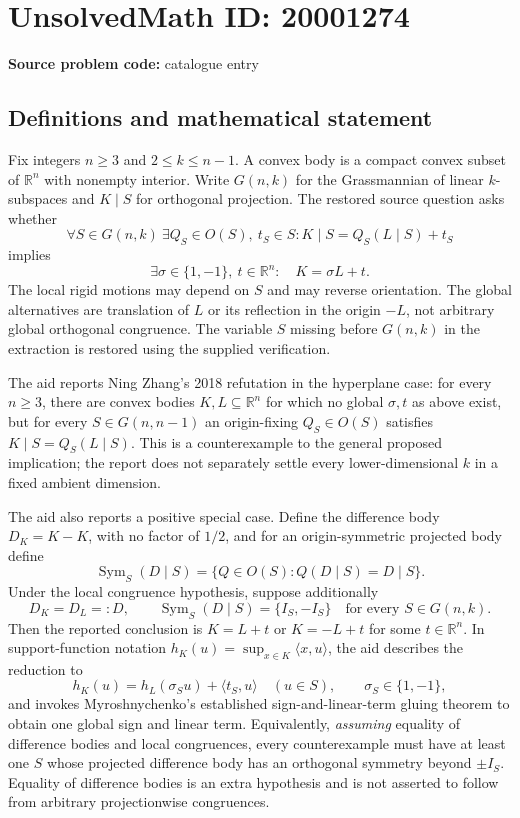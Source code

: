 \documentclass[11pt]{article}
\newcommand{\R}{\mathbb{R}}
\begin{document}
\section*{UnsolvedMath ID: 20001274}
\textbf{Source problem code:} catalogue entry
\subsection{Definitions and mathematical statement}
Fix integers \(n\geq3\) and \(2\leq k\leq n-1\). A convex body is a compact convex subset of \(\R^n\) with nonempty interior. Write \(G(n,k)\) for the Grassmannian of linear \(k\)-subspaces and \(K\mid S\) for orthogonal projection. The restored source question asks whether
\[
 \forall S\in G(n,k)\ \exists Q_S\in O(S),\ t_S\in S:
 K\mid S=Q_S(L\mid S)+t_S
\]
implies
\[
 \exists\sigma\in\{1,-1\},\ t\in\R^n:\quad K=\sigma L+t.
\]
The local rigid motions may depend on \(S\) and may reverse orientation. The global alternatives are translation of \(L\) or its reflection in the origin \(-L\), not arbitrary global orthogonal congruence. The variable \(S\) missing before \(G(n,k)\) in the extraction is restored using the supplied verification.

The aid reports Ning Zhang's 2018 refutation in the hyperplane case: for every \(n\geq3\), there are convex bodies \(K,L\subseteq\R^n\) for which no global \(\sigma,t\) as above exist, but for every \(S\in G(n,n-1)\) an origin-fixing \(Q_S\in O(S)\) satisfies \(K\mid S=Q_S(L\mid S)\). This is a counterexample to the general proposed implication; the report does not separately settle every lower-dimensional \(k\) in a fixed ambient dimension.

The aid also reports a positive special case. Define the difference body \(D_K=K-K\), with no factor of \(1/2\), and for an origin-symmetric projected body define
\[
 \operatorname{Sym}_S(D\mid S)=\{Q\in O(S):Q(D\mid S)=D\mid S\}.
\]
Under the local congruence hypothesis, suppose additionally
\[
 D_K=D_L=:D,\qquad
 \operatorname{Sym}_S(D\mid S)=\{I_S,-I_S\}\quad\text{for every }S\in G(n,k).
\]
Then the reported conclusion is \(K=L+t\) or \(K=-L+t\) for some \(t\in\R^n\). In support-function notation \(h_K(u)=\sup_{x\in K}\langle x,u\rangle\), the aid describes the reduction to
\[
 h_K(u)=h_L(\sigma_Su)+\langle t_S,u\rangle\quad(u\in S),\qquad \sigma_S\in\{1,-1\},
\]
and invokes Myroshnychenko's established sign-and-linear-term gluing theorem to obtain one global sign and linear term. Equivalently, \emph{assuming} equality of difference bodies and local congruences, every counterexample must have at least one \(S\) whose projected difference body has an orthogonal symmetry beyond \(\pm I_S\). Equality of difference bodies is an extra hypothesis and is not asserted to follow from arbitrary projectionwise congruences.
\end{document}
